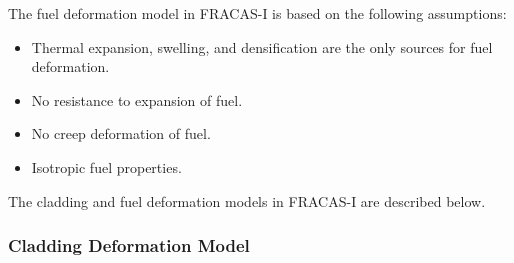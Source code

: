 The fuel deformation model in FRACAS-I is based on the following
assumptions:

\begin{itemize}
    \item Thermal expansion, swelling, and densification are the only sources for fuel deformation.
    \item No resistance to expansion of fuel.
    \item No creep deformation of fuel.
    \item Isotropic fuel properties.
\end{itemize}

The cladding and fuel deformation models in FRACAS-I are described
below.

\subsubsection{Cladding Deformation Model}\label{section:cladding-deformation-model}

